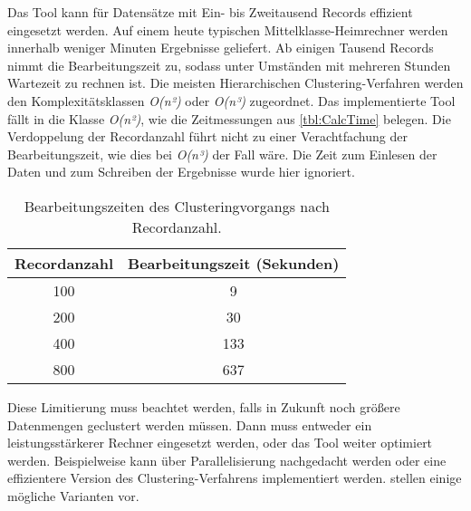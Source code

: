 Das Tool kann für Datensätze mit Ein- bis Zweitausend Records effizient eingesetzt werden.
Auf einem heute typischen Mittelklasse-Heimrechner werden innerhalb weniger Minuten Ergebnisse geliefert.
Ab einigen Tausend Records nimmt die Bearbeitungszeit zu,
sodass unter Umständen mit mehreren Stunden Wartezeit zu rechnen ist.
Die meisten Hierarchischen Clustering-Verfahren werden den Komplexitätsklassen
\emph{O(n²)} oder \emph{O(n³)} zugeordnet.
Das implementierte Tool fällt in die Klasse \emph{O(n²)},
wie die Zeitmessungen aus \autoref{tbl:CalcTime} belegen.
Die Verdoppelung der Recordanzahl führt nicht zu einer Verachtfachung der Bearbeitungszeit,
wie dies bei \emph{O(n³)} der Fall wäre.
Die Zeit zum Einlesen der Daten
und zum Schreiben der Ergebnisse wurde hier ignoriert.
\begin{table}[ht]
  \begin{center}
  \begin{tabular}{ |c|c| } 
   \hline
   Recordanzahl & Bearbeitungszeit (Sekunden) \\
   \hline \hline
   100 & 9 \\
   \hline
   200 & 30 \\
   \hline
   400 & 133 \\
   \hline
   800 & 637 \\
   \hline
  \end{tabular}
  \caption{Bearbeitungszeiten des Clusteringvorgangs nach Recordanzahl.}
  \label{tbl:CalcTime}
  \end{center}
\end{table}
Diese Limitierung muss beachtet werden,
falls in Zukunft noch größere Datenmengen geclustert werden müssen.
Dann muss entweder ein leistungsstärkerer Rechner eingesetzt werden,
oder das Tool weiter optimiert werden.
Beispielweise kann über Parallelisierung nachgedacht werden
oder eine effizientere Version des Clustering-Verfahrens implementiert werden.
\citet{patel_study_2015} stellen einige mögliche Varianten vor.

